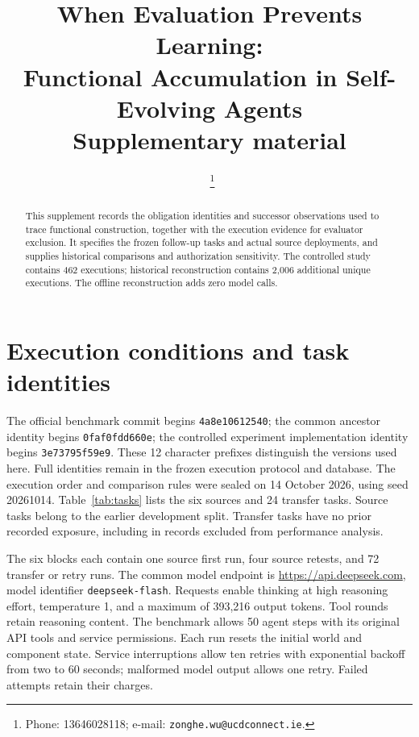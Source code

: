 \documentclass{ecai}
\begin{document}
\begin{frontmatter}
\title{When Evaluation Prevents Learning:\\
Functional Accumulation in Self-Evolving Agents\\[4pt]
\large Supplementary material}
\author[A,B]{~\thanks{Phone: 13646028118; e-mail: \nolinkurl{zonghe.wu@ucdconnect.ie}.}}
\address[A]{School of Architecture, Planning and Environmental Policy, University College Dublin, Belfield, Dublin 4, Ireland}
\address[B]{Chang'an-Dublin International College of Transportation, Chang'an University, Xi'an 710018, China}
\begin{abstract}
This supplement records the obligation identities and successor observations used to trace functional construction, together with the execution evidence for evaluator exclusion. It specifies the frozen follow-up tasks and actual source deployments, and supplies historical comparisons and authorization sensitivity. The controlled study contains 462 executions; historical reconstruction contains 2,006 additional unique executions. The offline reconstruction adds zero model calls.
\end{abstract}
\end{frontmatter}
\raggedbottom

\section{Execution conditions and task identities}

The official benchmark commit begins \texttt{4a8e10612540};
the common ancestor identity begins \texttt{0faf0fdd660e};
the controlled experiment implementation identity begins \texttt{3e73795f59e9}.
These 12 character prefixes distinguish the versions used here. Full identities remain in the frozen execution protocol and database.
The execution order and comparison rules were sealed on 14 October 2026, using seed 20261014. Table~\ref{tab:tasks} lists the six sources and 24 transfer tasks. Source tasks belong to the earlier development split. Transfer tasks have no prior recorded exposure, including in records excluded from performance analysis.

The six blocks each contain one source first run, four source retests, and 72 transfer or retry runs. The common model endpoint is \url{https://api.deepseek.com}, model identifier \texttt{deepseek-flash}. Requests enable thinking at high reasoning effort, temperature 1, and a maximum of 393,216 output tokens. Tool rounds retain reasoning content. The benchmark allows 50 agent steps with its original API tools and service permissions. Each run resets the initial world and component state. Service interruptions allow ten retries with exponential backoff from two to 60 seconds; malformed model output allows one retry. Failed attempts retain their charges.
\end{document}
